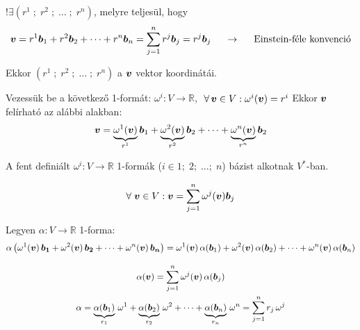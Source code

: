 \documentclass[main.tex]{subfiles}
\begin{document}
$!\exists \left(
  r^1 \; ; \;
  r^2 \; ; \;
  \dots \; ; \;
  r^n
  \right)$,
melyre teljesül, hogy
\begin{gather*}
  \bm{v}
  = r^1 \bm{b}_1
  + r^2 \bm{b}_2
  + \dots
  + r^n \bm{b}_n
  = \displaystyle\sum_{j=1}^{n} r^j \bm{b}_j
  = {r^j \bm{b}_j}
  \hspace{5mm} \rightarrow \hspace{5mm}
  \text{Einstein-féle konvenció}
\end{gather*}

Ekkor $\left(
  r^1 \; ; \;
  r^2 \; ; \;
  \dots \; ; \;
  r^n
  \right)$
a $\bm{v}$ vektor koordinátái.

\vspace{.5em}
Vezessük be a következő 1-formát:
$\omega^i: V \rightarrow \mathbb{R}$,
$\; \forall \, \bm{v} \in V: \omega^i(\bm{v}) = r^i$
Ekkor $\bm{v}$ felírható az alábbi alakban:
\begin{gather*}
  \bm{v}
  = \underbrace{\omega^1(\bm{v})}_{r^1} \bm{b}_1
  + \underbrace{\omega^2(\bm{v})}_{r^2} \bm{b}_2
  + \dots
  + \underbrace{\omega^n(\bm{v})}_{r^n} \bm{b}_2
\end{gather*}




A fent definiált $\omega^i: V \rightarrow \mathbb{R}$ 1-formák
($i \in {1;\; 2;\; \dots;\; n}$) bázist alkotnak $V^{*}$-ban.



\begin{gather*}
  \forall \; \bm{v} \in V: \bm{v}
  = \sum_{j = 1}^n \omega^j(\bm{v}) \bm{b}_j
\end{gather*}

Legyen $\alpha: V \rightarrow \mathbb{R}$ 1-forma:
\begin{gather*}
  \alpha \left(
  \omega^1(\bm{v}) \, \bm{b_1}
  + \omega^2(\bm{v}) \, \bm{b_2}
  + \dots
  + \omega^n(\bm{v}) \, \bm{b_n}
  \right)
  = \omega^1(\bm{v}) \, \alpha(\bm{b}_1)
  + \omega^2(\bm{v}) \, \alpha(\bm{b}_2)
  + \dots
  + \omega^n(\bm{v}) \, \alpha(\bm{b}_n)
  \\[
  3mm
  ]
  \alpha(\bm{v})
  = \sum_{j=1}^n \omega^j(\bm{v}) \, \alpha(\bm{b}_j)
  \\[
  0mm
  ]
  \alpha
  = \underbrace{\alpha(\bm{b}_1)}_{r_1} \, \omega^1
  + \underbrace{\alpha(\bm{b}_2)}_{r_2} \, \omega^2
  + \dots
  + \underbrace{\alpha(\bm{b}_n)}_{r_n} \, \omega^n
  = \sum_{j=1}^n r_j \, \omega^j
\end{gather*}
\end{document}
